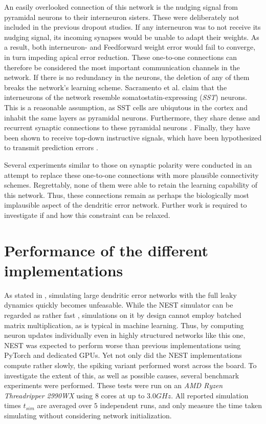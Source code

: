 An easily overlooked connection of this network is the nudging signal from pyramidal neurons to their interneuron
sisters. These were deliberately not included in the previous dropout studies. If any interneuron was to not receive its
nudging signal, its incoming synapses would be unable to adapt their weights. As a result, both interneuron- and
Feedforward weight error would fail to converge, in turn impeding apical error reduction. These one-to-one connections
can  therefore be considered the most important communication channels in the network. If there is no redundancy in the
neurons, the deletion of any of them breaks the network's learning scheme. Sacramento et al. claim that the interneurons
of the network resemble somatostatin-expressing (\textit{SST}) neurons. This is a reasonable assumption, as SST cells
are ubiqutous in the cortex and inhabit the same layers as pyramidal neurons. Furthermore, they share dense and
recurrent synaptic connections to these pyramidal neurons \citep{urban2016somatostatin}. Finally, they have been shown
to receive top-down instructive signals, which have been hypothesized to transmit prediction errors
\citep{Leinweber2017}.

Several experiments similar to those on synaptic polarity were conducted in an attempt to replace these one-to-one
connections with more plausible connectivity schemes. Regrettably, none of them were able to retain the learning
capability of this network. Thus, these connections remain as perhaps the biologically most implausible aspect of the
dendritic error network. Further work is required to investigate if and how this constraint can be relaxed.



\section{Performance of the different implementations}\label{sec-benchmark}

As stated in \citep{Haider2021}, simulating large dendritic error networks with the full leaky dynamics quickly becomes
unfeasable. While the NEST simulator can be regarded as rather fast \citep{albada2018performance}, simulations on it by
design cannot employ batched matrix multiplication, as is typical in machine learning. Thus, by computing neuron updates
individually even in highly structured networks like this one, NEST was expected to perform worse than previous
implementations using PyTorch and dedicated GPUs. Yet not only did the NEST implementations compute rather slowly, the
spiking variant performed worst across the board. To investigate the extent of this, as well as possible causes, several
benchmark experiments were performed. These tests were run on an \textit{AMD Ryzen Threadripper 2990WX} using 8 cores at
up to $3.0GHz$. All reported simulation times $t_{sim}$ are averaged over $5$ independent runs, and only measure the
time taken simulating without considering network initialization. \newline


